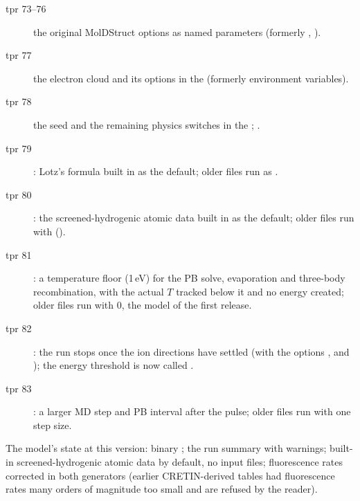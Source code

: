 \begin{description}
  \item[tpr 73--76] the original MolDStruct options as named  parameters (formerly ,
    ).
  \item[tpr 77] the electron cloud and its options in the  (formerly environment variables).
  \item[tpr 78] the seed and the remaining physics switches in the ; .
  \item[tpr 79] : Lotz's formula built in as the default; older  files run as
    .
  \item[tpr 80] : the screened-hydrogenic atomic data built in as the default; older
     files run with  ().
  \item[tpr 81] : a temperature floor (1\,eV) for the PB solve, evaporation and three-body
    recombination, with the actual $T$ tracked below it and no energy created; older  files run with 0, the
    model of the first release.
  \item[tpr 82] : the run stops once the ion directions have settled (with the options
    ,  and ); the energy threshold is now called
    .
  \item[tpr 83] : a larger MD step and PB interval after the pulse; older  files run
    with one step size.
\end{description}
The model's state at this version: binary ; the run summary with warnings; built-in
screened-hydrogenic atomic data by default, no input files; fluorescence rates corrected in both generators (earlier CRETIN-derived tables had
fluorescence rates many orders of magnitude too small and are refused by the reader).
